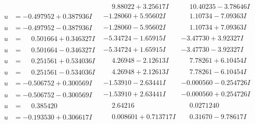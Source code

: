 \documentclass[1p]{elsarticle_modified}
\theoremstyle{definition}
\begin{document}
$$\begin{array}{c|c|c}
 & \phantom{-}9.88022 + 3.25617 I & \phantom{-}10.40235 - 3.78646 I \\ \hline\begin{aligned}
u &= -0.497952 + 0.387936 I\end{aligned}
 & -1.28060 + 5.95602 I & \phantom{-}1.10734 - 7.09363 I \\ \hline\begin{aligned}
u &= -0.497952 - 0.387936 I\end{aligned}
 & -1.28060 - 5.95602 I & \phantom{-}1.10734 + 7.09363 I \\ \hline\begin{aligned}
u &= \phantom{-}0.501664 + 0.346327 I\end{aligned}
 & -5.34724 - 1.65915 I & -3.47730 + 3.92327 I \\ \hline\begin{aligned}
u &= \phantom{-}0.501664 - 0.346327 I\end{aligned}
 & -5.34724 + 1.65915 I & -3.47730 - 3.92327 I \\ \hline\begin{aligned}
u &= \phantom{-}0.251561 + 0.534036 I\end{aligned}
 & \phantom{-}4.26948 - 2.12613 I & \phantom{-}7.78261 + 6.10454 I \\ \hline\begin{aligned}
u &= \phantom{-}0.251561 - 0.534036 I\end{aligned}
 & \phantom{-}4.26948 + 2.12613 I & \phantom{-}7.78261 - 6.10454 I \\ \hline\begin{aligned}
u &= -0.506752 + 0.300569 I\end{aligned}
 & -1.53910 - 2.63441 I & -0.000560 - 0.254726 I \\ \hline\begin{aligned}
u &= -0.506752 - 0.300569 I\end{aligned}
 & -1.53910 + 2.63441 I & -0.000560 + 0.254726 I \\ \hline\begin{aligned}
u &= \phantom{-}0.385420\phantom{ +0.000000I}\end{aligned}
 & \phantom{-}2.64216\phantom{ +0.000000I} & \phantom{-}0.0271240\phantom{ +0.000000I} \\ \hline\begin{aligned}
u &= -0.193530 + 0.306617 I\end{aligned}
 & \phantom{-}0.008601 + 0.713717 I & \phantom{-}0.31670 - 9.78617 I \\ \hline\begin{aligned}

\end{aligned}
\end{array}$$
\end{document}
